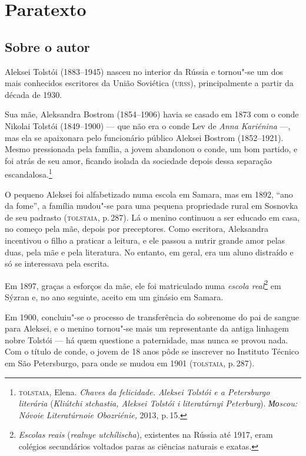 \chapter{Paratexto}\label{paratexto}


\section{Sobre o autor}\label{para1}

\noindent{}Aleksei Tolstói (1883--1945) nasceu no interior da Rússia e tornou"-se um
dos mais conhecidos escritores da União Soviética (\textsc{urss}), principalmente
a partir da década de 1930.

Sua mãe, Aleksandra Bostrom (1854--1906) havia se casado em 1873 com o
conde Nikolai Tolstói (1849--1900) --- que não era o conde Lev de
\emph{Anna Kariénina} ---, mas ela se apaixonara pelo funcionário
público Aleksei Bostrom (1852--1921). Mesmo pressionada pela família, a
jovem abandonou o conde, um bom partido, e foi atrás de seu amor,
ficando isolada da sociedade depois dessa separação
escandalosa.\footnote{\textsc{tolstaia}, Elena. \emph{Chaves da felicidade.
  Aleksei Tolstói e a Petersburgo literária} (\emph{Kliútchi stchastia,
  Aleksei Tolstói i literatúrnyi Peterburg}). \emph{Моscou: Nóvoie
  Literatúrnoie Obozriénie,} 2013, p.\,15.}

O pequeno Aleksei foi alfabetizado numa escola em Samara, mas em 1892,
``ano da fome'', a família mudou"-se para uma pequena propriedade rural
em Sosnovka de seu padrasto (\textsc{tolstaia}, p.\,287). Lá o menino continuou a
ser educado em casa, no começo pela mãe, depois por preceptores. Como
escritora, Aleksandra incentivou o filho a praticar a leitura, e ele
passou a nutrir grande amor pelas duas, pela mãe e pela literatura. No
entanto, em geral, era um aluno distraído e só se interessava pela
escrita.

Em 1897, graças a esforços da mãe, ele foi matriculado numa \emph{escola
real}\footnote{\emph{Escolas reais} (\emph{realnye utchílischa}),
  existentes na Rússia até 1917, eram colégios secundários voltados
  paras as ciências naturais e exatas.} em Sýzran e, no ano seguinte,
aceito em um ginásio em Samara.

Em 1900, concluiu"-se o processo de transferência do sobrenome do pai de
sangue para Aleksei, e o menino tornou"-se mais um representante da
antiga linhagem nobre Tolstói --- há quem questione a paternidade, mas
nunca se provou nada. Com o título de conde, o jovem de 18 anos pôde se
inscrever no Instituto Técnico em São Petersburgo, para onde se mudou em
1901 (\textsc{tolstaia}, p.\,287).

